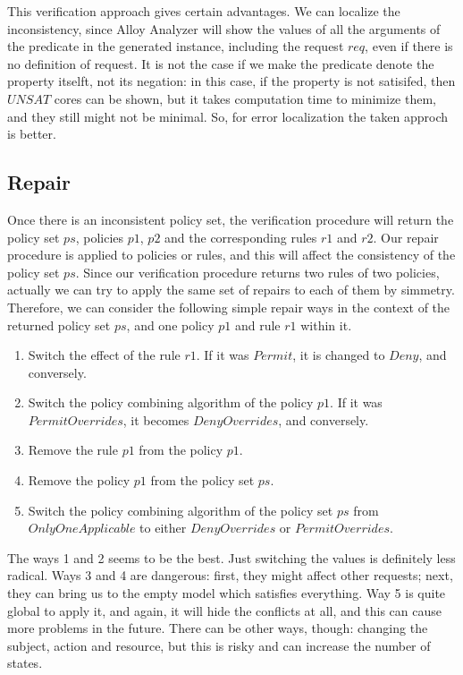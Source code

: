 \documentclass{acm_proc_article-sp}
\begin{document}
This verification approach gives certain advantages. We can localize the inconsistency, since Alloy Analyzer will show the values of all the arguments of the predicate in the generated instance, including the request $req$, even if there is no definition of request. It is not the case if we make the predicate denote the property itselft, not its negation: in this case, if the property is not satisifed, then $UNSAT$ cores can be shown, but it takes computation time to minimize them, and they still might not be minimal. So, for error localization the taken approch is better.

\subsection{Repair}

Once there is an inconsistent policy set, the verification procedure will return the policy set $ps$, policies $p1$, $p2$ and the corresponding rules $r1$ and $r2$. Our repair procedure is applied to policies or rules, and this will affect the consistency of the policy set $ps$. Since our verification procedure returns two rules of two policies, actually we can try to apply the same set of repairs to each of them by simmetry. Therefore, we can consider the following simple repair ways in the context of the returned policy set $ps$, and one policy $p1$ and rule $r1$ within it.

\begin{enumerate}
\item Switch the effect of the rule $r1$. If it was $Permit$, it is changed to $Deny$, and conversely.
\item Switch the policy combining algorithm of the policy $p1$. If it was $PermitOverrides$, it becomes $DenyOverrides$, and conversely.
\item Remove the rule $p1$ from the policy $p1$.
\item Remove the policy $p1$ from the policy set $ps$.
\item Switch the policy combining algorithm of the policy set $ps$ from $OnlyOneApplicable$ to either $DenyOverrides$ or $PermitOverrides$.
\end{enumerate}

The ways 1 and 2 seems to be the best. Just switching the values is definitely less radical. Ways 3 and 4 are dangerous: first, they might affect other requests; next, they can bring us to the empty model which satisfies everything. Way 5 is quite global to apply it, and again, it will hide the conflicts at all, and this can cause more problems in the future. There can be other ways, though: changing the subject, action and resource, but this is risky and can increase the number of states. 
\end{document}
